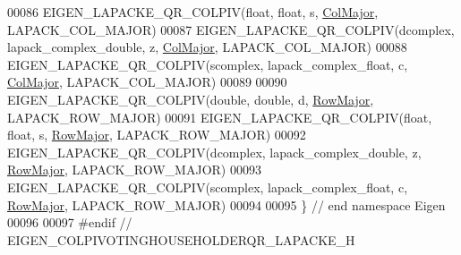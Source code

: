 \begin{DoxyCode}
00086 EIGEN\_LAPACKE\_QR\_COLPIV(\textcolor{keywordtype}{float},    \textcolor{keywordtype}{float},         s, \hyperlink{group__enums_ggaacded1a18ae58b0f554751f6cdf9eb13a0cbd4bdd0abcfc0224c5fcb5e4f6669a}{ColMajor}, LAPACK\_COL\_MAJOR)
00087 EIGEN\_LAPACKE\_QR\_COLPIV(dcomplex, lapack\_complex\_double, z, \hyperlink{group__enums_ggaacded1a18ae58b0f554751f6cdf9eb13a0cbd4bdd0abcfc0224c5fcb5e4f6669a}{ColMajor}, LAPACK\_COL\_MAJOR)
00088 EIGEN\_LAPACKE\_QR\_COLPIV(scomplex, lapack\_complex\_float,  c, \hyperlink{group__enums_ggaacded1a18ae58b0f554751f6cdf9eb13a0cbd4bdd0abcfc0224c5fcb5e4f6669a}{ColMajor}, LAPACK\_COL\_MAJOR)
00089 
00090 EIGEN\_LAPACKE\_QR\_COLPIV(\textcolor{keywordtype}{double},   \textcolor{keywordtype}{double},        d, \hyperlink{group__enums_ggaacded1a18ae58b0f554751f6cdf9eb13acfcde9cd8677c5f7caf6bd603666aae3}{RowMajor}, LAPACK\_ROW\_MAJOR)
00091 EIGEN\_LAPACKE\_QR\_COLPIV(\textcolor{keywordtype}{float},    \textcolor{keywordtype}{float},         s, \hyperlink{group__enums_ggaacded1a18ae58b0f554751f6cdf9eb13acfcde9cd8677c5f7caf6bd603666aae3}{RowMajor}, LAPACK\_ROW\_MAJOR)
00092 EIGEN\_LAPACKE\_QR\_COLPIV(dcomplex, lapack\_complex\_double, z, \hyperlink{group__enums_ggaacded1a18ae58b0f554751f6cdf9eb13acfcde9cd8677c5f7caf6bd603666aae3}{RowMajor}, LAPACK\_ROW\_MAJOR)
00093 EIGEN\_LAPACKE\_QR\_COLPIV(scomplex, lapack\_complex\_float,  c, \hyperlink{group__enums_ggaacded1a18ae58b0f554751f6cdf9eb13acfcde9cd8677c5f7caf6bd603666aae3}{RowMajor}, LAPACK\_ROW\_MAJOR)
00094 
00095 \} \textcolor{comment}{// end namespace Eigen}
00096 
00097 \textcolor{preprocessor}{#endif // EIGEN\_COLPIVOTINGHOUSEHOLDERQR\_LAPACKE\_H}
\end{DoxyCode}
